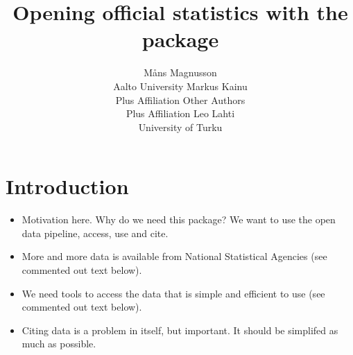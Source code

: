 \documentclass[article]{jss}
\author{M\r{a}ns Magnusson\\Aalto University \And 
        Markus Kainu\\Plus Affiliation  \And 
        Other Authors\\Plus Affiliation  \And
        Leo Lahti\\University of Turku}
\title{Opening  official statistics with the \pkg{pxweb} package}
\begin{document}


\section[Introduction]{Introduction}

\begin{itemize}
    \item Motivation here. Why do we need this package? We want to use the open data pipeline, access, use and cite.
    \item More and more data is available from National Statistical Agencies (see commented out text below).
    \item We need tools to access the data that is simple and efficient to use (see commented out text below).
    \item Citing data is a problem in itself, but important. It should be simplifed as much as possible.
\end{itemize}



\end{document}

